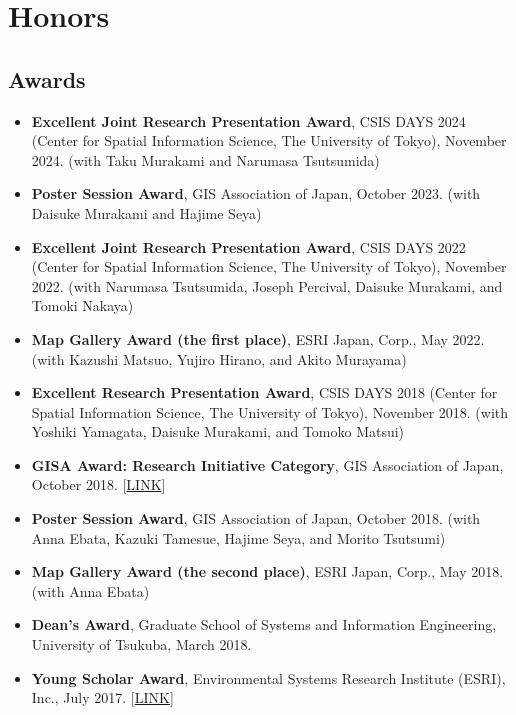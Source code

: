 \documentclass[
]{book}
\providecommand{\tightlist}{%
  \setlength{\itemsep}{0pt}\setlength{\parskip}{0pt}}
\begin{document}
\chapter*{Honors}\label{honors}

\section*{Awards}\label{awards}

\begin{itemize}
\tightlist
\item
  \textbf{Excellent Joint Research Presentation Award}, CSIS DAYS 2024 (Center for Spatial Information Science, The University of Tokyo), November 2024.
  (with Taku Murakami and Narumasa Tsutsumida)
\item
  \textbf{Poster Session Award}, GIS Association of Japan, October 2023.
  (with Daisuke Murakami and Hajime Seya)
\item
  \textbf{Excellent Joint Research Presentation Award}, CSIS DAYS 2022 (Center for Spatial Information Science, The University of Tokyo), November 2022.
  (with Narumasa Tsutsumida, Joseph Percival, Daisuke Murakami, and Tomoki Nakaya)
\item
  \textbf{Map Gallery Award (the first place)}, ESRI Japan, Corp., May 2022.
  (with Kazushi Matsuo, Yujiro Hirano, and Akito Murayama)
\item
  \textbf{Excellent Research Presentation Award}, CSIS DAYS 2018 (Center for Spatial Information Science, The University of Tokyo), November 2018.
  (with Yoshiki Yamagata, Daisuke Murakami, and Tomoko Matsui)
\item
  \textbf{GISA Award: Research Initiative Category}, GIS Association of Japan, October 2018. {[}\href{https://www.gisa-japan.org/content/files/nl108.pdf}{LINK}{]}
\item
  \textbf{Poster Session Award}, GIS Association of Japan, October 2018.
  (with Anna Ebata, Kazuki Tamesue, Hajime Seya, and Morito Tsutsumi)
\item
  \textbf{Map Gallery Award (the second place)}, ESRI Japan, Corp., May 2018.
  (with Anna Ebata)
\item
  \textbf{Dean's Award}, Graduate School of Systems and Information Engineering, University of Tsukuba, March 2018.
\item
  \textbf{Young Scholar Award}, Environmental Systems Research Institute (ESRI), Inc., July 2017. {[}\href{https://www.esrij.com/cgi-bin/wp/wp-content/uploads/2017/01/YSA-Taiken2017.pdf}{LINK}{]}

\end{itemize}
\end{document}
